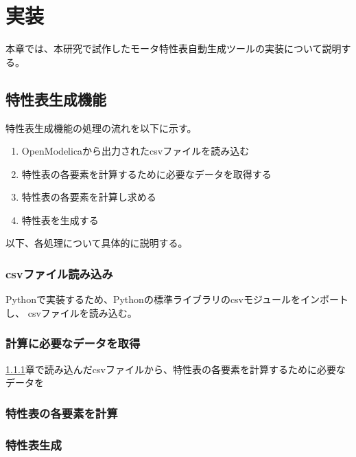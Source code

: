 \chapter{実装}\label{cha:Implementation}

本章では、本研究で試作したモータ特性表自動生成ツールの実装について説明する。

\section{特性表生成機能}\label{tokuseihyou_seisei}



特性表生成機能の処理の流れを以下に示す。
\begin{enumerate}
    \item OpenModelicaから出力されたcsvファイルを読み込む
    \item 特性表の各要素を計算するために必要なデータを取得する
    \item 特性表の各要素を計算し求める
    \item 特性表を生成する
\end{enumerate}

以下、各処理について具体的に説明する。

\subsection{csvファイル読み込み}\label{sub:csvfairu}
Pythonで実装するため、Pythonの標準ライブラリのcsvモジュールをインポートし、
csvファイルを読み込む。

\subsection{計算に必要なデータを取得}\label{sub:syutoku_data}
\ref{sub:csvfairu}章で読み込んだcsvファイルから、特性表の各要素を計算するために必要なデータを


\subsection{特性表の各要素を計算}\label{sub:keisan}

\subsection{特性表生成}\label{sub:seisei_hyou}